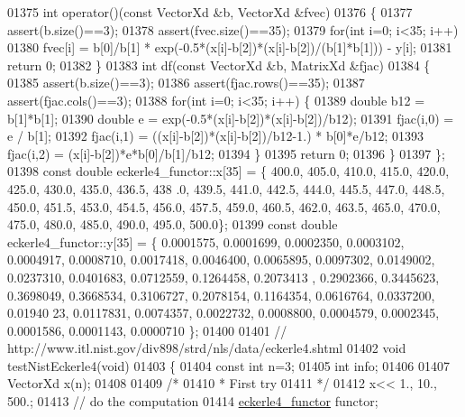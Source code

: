 \begin{DoxyCode}
01375     \textcolor{keywordtype}{int} operator()(\textcolor{keyword}{const} VectorXd &b, VectorXd &fvec)
01376     \{
01377         assert(b.size()==3);
01378         assert(fvec.size()==35);
01379         \textcolor{keywordflow}{for}(\textcolor{keywordtype}{int} i=0; i<35; i++)
01380             fvec[i] = b[0]/b[1] * exp(-0.5*(x[i]-b[2])*(x[i]-b[2])/(b[1]*b[1])) - y[i];
01381         \textcolor{keywordflow}{return} 0;
01382     \}
01383     \textcolor{keywordtype}{int} df(\textcolor{keyword}{const} VectorXd &b, MatrixXd &fjac)
01384     \{
01385         assert(b.size()==3);
01386         assert(fjac.rows()==35);
01387         assert(fjac.cols()==3);
01388         \textcolor{keywordflow}{for}(\textcolor{keywordtype}{int} i=0; i<35; i++) \{
01389             \textcolor{keywordtype}{double} b12 = b[1]*b[1];
01390             \textcolor{keywordtype}{double} e = exp(-0.5*(x[i]-b[2])*(x[i]-b[2])/b12);
01391             fjac(i,0) = e / b[1];
01392             fjac(i,1) = ((x[i]-b[2])*(x[i]-b[2])/b12-1.) * b[0]*e/b12;
01393             fjac(i,2) = (x[i]-b[2])*e*b[0]/b[1]/b12;
01394         \}
01395         \textcolor{keywordflow}{return} 0;
01396     \}
01397 \};
01398 \textcolor{keyword}{const} \textcolor{keywordtype}{double} eckerle4\_functor::x[35] = \{ 400.0, 405.0, 410.0, 415.0, 420.0, 425.0, 430.0, 435.0, 436.5, 438
      .0, 439.5, 441.0, 442.5, 444.0, 445.5, 447.0, 448.5, 450.0, 451.5, 453.0, 454.5, 456.0, 457.5, 459.0, 460.5,
       462.0, 463.5, 465.0, 470.0, 475.0, 480.0, 485.0, 490.0, 495.0, 500.0\};
01399 \textcolor{keyword}{const} \textcolor{keywordtype}{double} eckerle4\_functor::y[35] = \{ 0.0001575, 0.0001699, 0.0002350, 0.0003102, 0.0004917, 0.0008710, 
      0.0017418, 0.0046400, 0.0065895, 0.0097302, 0.0149002, 0.0237310, 0.0401683, 0.0712559, 0.1264458, 0.2073413
      , 0.2902366, 0.3445623, 0.3698049, 0.3668534, 0.3106727, 0.2078154, 0.1164354, 0.0616764, 0.0337200, 0.01940
      23, 0.0117831, 0.0074357, 0.0022732, 0.0008800, 0.0004579, 0.0002345, 0.0001586, 0.0001143, 0.0000710 \};
01400 
01401 \textcolor{comment}{// http://www.itl.nist.gov/div898/strd/nls/data/eckerle4.shtml}
01402 \textcolor{keywordtype}{void} testNistEckerle4(\textcolor{keywordtype}{void})
01403 \{
01404   \textcolor{keyword}{const} \textcolor{keywordtype}{int} n=3;
01405   \textcolor{keywordtype}{int} info;
01406 
01407   VectorXd x(n);
01408 
01409   \textcolor{comment}{/*}
01410 \textcolor{comment}{   * First try}
01411 \textcolor{comment}{   */}
01412   x<< 1., 10., 500.;
01413   \textcolor{comment}{// do the computation}
01414   \hyperlink{structeckerle4__functor}{eckerle4\_functor} functor;

\end{DoxyCode}
